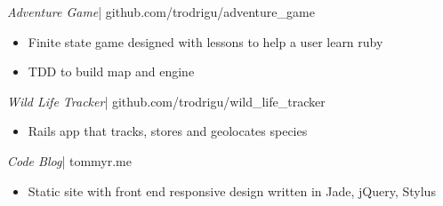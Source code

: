 \documentclass[margin]{res}
\begin{document}
\begin{resume}
  {\sl Adventure Game}|
  github.com/trodrigu/adventure\_game
  \begin{itemize}
      \item Finite state game designed with lessons to help a user learn ruby
      \item TDD to build map and engine 
  \end{itemize}

  {\sl Wild Life Tracker}| 
  github.com/trodrigu/wild\_life\_tracker
  \begin{itemize}
      \item Rails app that tracks, stores and geolocates species
  \end{itemize}

  {\sl Code Blog}| 
  tommyr.me
  \begin{itemize}
      \item Static site with front end responsive design written in Jade, jQuery, Stylus
  \end{itemize}



\end{resume}
\end{document}
